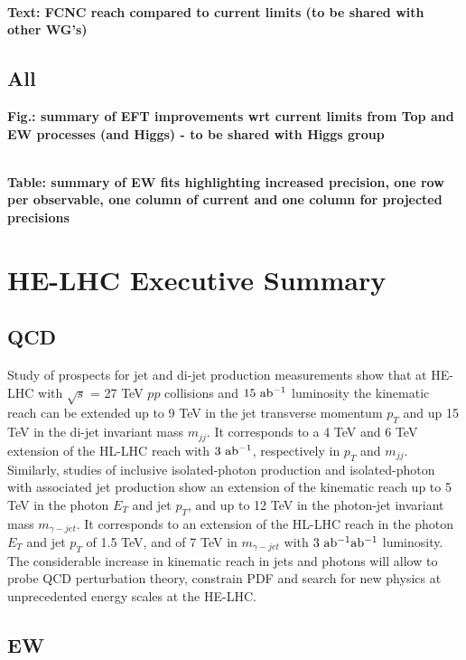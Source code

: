 \documentclass{article}
\begin{document}
\\
{\bf Text: FCNC reach compared to current limits (to be shared with other WG's)}

\subsection{All}


{\bf Fig.: summary of EFT improvements wrt current limits from Top and EW processes (and Higgs) - to be shared with Higgs group}


\\
{\bf Table: summary of EW fits highlighting increased precision, one row per observable, one column of current and one column for projected precisions}



\clearpage
\section{HE-LHC Executive Summary}

\subsection{QCD}

Study of prospects for jet and di-jet production measurements show that at HE-LHC with $\sqrt{s}$ = 27 TeV $pp$ collisions and $15~ {\rm ab^{-1}}$ luminosity the kinematic reach can be extended up to 9 TeV in the jet transverse momentum $p_T$ and up 15 TeV in the di-jet invariant mass $m_{jj}$. It corresponds to a 4 TeV and 6 TeV extension of the HL-LHC reach with $3~ {\rm ab^{-1}}$, respectively in $p_T$ and $m_{jj}$. Similarly, studies of inclusive isolated-photon production and isolated-photon with associated jet production show an extension of the kinematic reach up to 5 TeV in the photon $E_T$ and jet $p_T$, and up to 12 TeV in the photon-jet invariant mass $m_{\gamma - jet}$. It corresponds to an extension of the HL-LHC reach in the photon $E_T$ and jet $p_T$ of 1.5 TeV, and of 7 TeV in $m_{\gamma - jet}$ with $3 ~{\rm ab^{-1}}{\rm ab^{-1}}$ luminosity.
The considerable increase in kinematic reach in jets and photons will allow to probe QCD perturbation theory, constrain PDF and search for new physics at unprecedented energy scales at the HE-LHC.
\subsection{EW}
\end{document}
